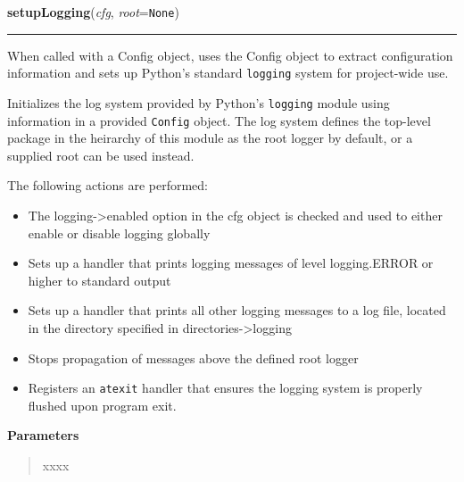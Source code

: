 \hspace{.8\funcindent}\begin{boxedminipage}{\funcwidth}

    \raggedright \textbf{setupLogging}(\textit{cfg}, \textit{root}={\tt None})

    \vspace{-1.5ex}

    \rule{\textwidth}{0.5\fboxrule}
\setlength{\parskip}{2ex}
    When called with a Config object, uses the Config object to extract 
    configuration information and sets up Python's standard 
    \texttt{logging} system for project-wide use.

    Initializes the log system provided by Python's \texttt{logging} module
    using information in a provided \texttt{Config} object. The log system 
    defines the top-level package in the heirarchy of this module as the 
    root logger by default, or a supplied root can be used instead.

    The following actions are performed:

    \begin{itemize}
    \setlength{\parskip}{0.6ex}
      \item The logging-{\textgreater}enabled option in the cfg object is 
        checked and used to either enable or disable logging globally

      \item Sets up a handler that prints logging messages of level 
        logging.ERROR or higher to standard output

      \item Sets up a handler that prints all other logging messages to a log 
        file, located in the directory specified in 
        directories-{\textgreater}logging

      \item Stops propagation of messages above the defined root logger

      \item Registers an \texttt{atexit} handler that ensures the logging 
        system is properly flushed upon program exit.

    \end{itemize}

\setlength{\parskip}{1ex}
      \textbf{Parameters}
      \vspace{-1ex}

      \begin{quote}
        \begin{Ventry}{xxxx}


\end{Ventry}
\end{quote}
\end{boxedminipage}
